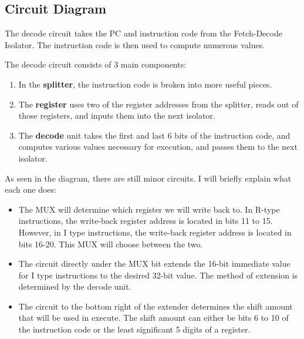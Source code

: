 \documentclass{article}
\begin{document}
\subsection{Circuit Diagram}
The decode circuit takes the PC and instruction code from the Fetch-Decode Isolator. The instruction code is then used to compute numerous values. 

\newpage
The decode circuit consists of 3 main components: 
\begin{enumerate}
\item
In the \textbf{splitter}, the instruction code is broken into more useful pieces.

\item
The \textbf{register} uses two of the register addresses from the splitter, reads out of those registers, and inputs them into the next isolator.

\item
The \textbf{decode} unit takes the first and last 6 bits of the instruction code, and computes various values necessary for execution, and passes them to the next isolator. 
\end{enumerate}
As seen in the diagram, there are still minor circuits. I will briefly explain what each one does:
\begin{itemize}
\item
The MUX will determine which register we will write back to. In R-type instructions, the write-back register address is located in bits 11 to 15. However, in I type instructions, the write-back register address is located in bits 16-20. This MUX will choose between the two.

\item
The circuit directly under the MUX bit extends the 16-bit immediate value for I type instructions to the desired 32-bit value. The method of extension is determined by the decode unit.

\item
The circuit to the bottom right of the extender determines the shift amount that will be used in execute. The shift amount can either be bits 6 to 10 of the instruction code or the least significant 5 digits of a register. 
\end{itemize}
\end{document}

